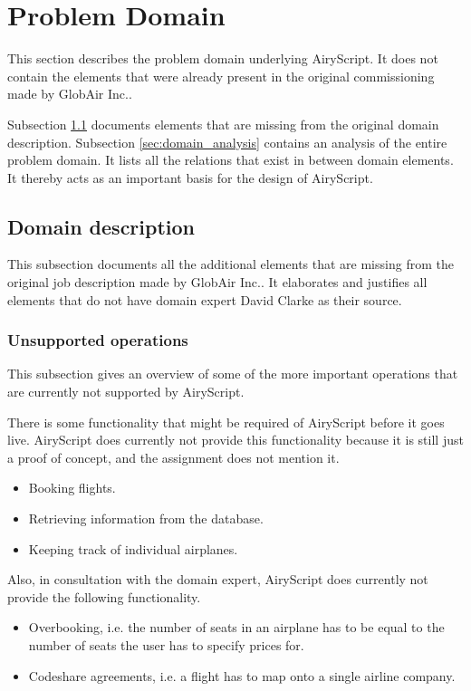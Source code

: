 \section{Problem Domain}
\label{sec:domain}

This section describes the problem domain underlying AiryScript. It does not
contain the elements that were already present in the original commissioning
made by GlobAir Inc..

Subsection \ref{sec:domain_description} documents elements that are
missing from the original domain description.
%
Subsection \ref{sec:domain_analysis} contains an analysis of the entire problem
domain. It lists all the relations that exist in between domain elements.
It thereby acts as an important basis for the design of AiryScript.

\subsection{Domain description}
\label{sec:domain_description}
This subsection documents all the additional elements that are missing from the
original job description made by GlobAir Inc.. It elaborates and justifies all
elements that do not have domain expert David Clarke as their source.


\subsubsection{Unsupported operations}
\label{sec:unsupported}
This subsection gives an overview of some of the more important operations that
are currently not supported by AiryScript.

There is some functionality that might be required of AiryScript before it goes
live. AiryScript does currently not provide this functionality because it is
still just a proof of concept, and the assignment does not mention it.
\begin{itemize}
  \item Booking flights.
  \item Retrieving information from the database.
  \item Keeping track of individual airplanes.
\end{itemize}

Also, in consultation with the domain expert, AiryScript does currently not
provide the following functionality.
\begin{itemize}
  \item Overbooking, i.e. the number of seats in an airplane has to be equal to
    the number of seats the user has to specify prices for.
  \item Codeshare agreements, i.e. a flight has to map onto a single airline
    company.
\end{itemize}

